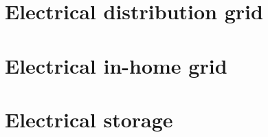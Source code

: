 \section{Electrical distribution grid}

\section{Electrical in-home grid}

\section{Electrical storage}

%







